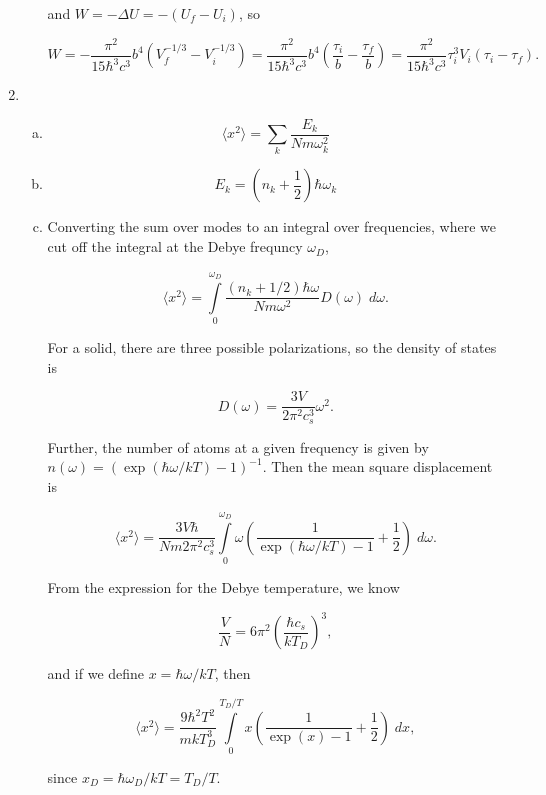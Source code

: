 \documentclass{article}
\begin{document}
\begin{enumerate}
\begin{enumerate}[(a)]
		and $W = -\Delta U = -(U_f - U_i)$, so

		$$W = - \frac{\pi^2}{15 \hbar^3 c^3} b^4 (V_f^{-1/3} - V_i^{-1/3}) = \frac{\pi^2}{15 \hbar^3 c^3} b^4 \left( \frac{\tau_i}{b} - \frac{\tau_f}{b} \right) = \frac{\pi^2}{15 \hbar^3 c^3} \tau_i^3 V_i (\tau_i - \tau_f).$$

	\end{enumerate}

	\item

	\begin{enumerate}[(a)]

		\item

		$$\langle x^2 \rangle = \sum_k \frac{E_k}{N m \omega_k^2}$$

		\item

		$$E_k = \left(n_k + \frac{1}{2} \right)\hbar \omega_k$$

		\item

		Converting the sum over modes to an integral over frequencies, where we cut off the integral at the Debye frequncy $\omega_D$,

		$$\langle x^2 \rangle = \int \limits_0^{\omega_D} \frac{(n_k + 1/2) \hbar \omega}{N m \omega^2} D(\omega) \; d\omega.$$

		For a solid, there are three possible polarizations, so the density of states is

		$$D(\omega) = \frac{3 V}{2\pi^2 c_s^3} \omega^2.$$

		Further, the number of atoms at a given frequency is given by $n(\omega) = (\exp(\hbar \omega / kT) - 1)^{-1}.$ Then the mean square displacement is 

		$$\langle x^2 \rangle = \frac{3V \hbar}{Nm 2\pi^2 c_s^3}\int \limits_0^{\omega_D} \omega\left( \frac{1}{\exp(\hbar \omega/kT) - 1} + \frac{1}{2} \right) \; d\omega.$$

		From the expression for the Debye temperature, we know

		$$\frac{V}{N} = 6 \pi^2 \left(\frac{\hbar c_s}{kT_D} \right)^3,$$

		and if we define $x = \hbar \omega / kT$, then

		$$\langle x^2 \rangle = \frac{9 \hbar^2 T^2}{mkT_D^3} \int \limits_0^{T_D/T} x \left( \frac{1}{\exp(x) - 1} + \frac{1}{2} \right) \; dx,$$

		since $x_D = \hbar \omega_D / kT = T_D / T.$


\end{enumerate}
\end{enumerate}
\end{document}

